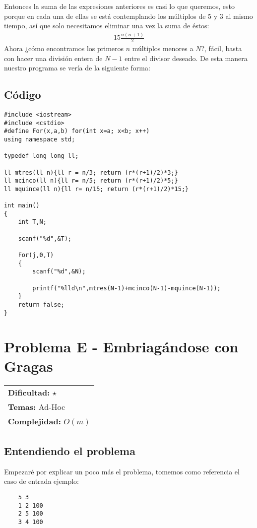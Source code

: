 Entonces la suma de las expresiones anteriores es casi lo que queremos, esto porque en cada una de ellas se está contemplando los múltiplos de 5 y 3 al mismo tiempo, así que solo necesitamos eliminar una vez la suma de éstos:
\begin{eqnarray*}
15 \frac{n(n+1)}{2}
\end{eqnarray*}
Ahora ¿cómo encontramos los primeros $n$ múltiplos menores a $N$?, fácil, basta con hacer una división entera de $N-1$ entre el divisor deseado. De esta manera  nuestro programa se vería de la siguiente forma:

\subsection*{Código}
\begin{verbatim}
#include <iostream>
#include <cstdio>
#define For(x,a,b) for(int x=a; x<b; x++)
using namespace std;

typedef long long ll;

ll mtres(ll n){ll r = n/3; return (r*(r+1)/2)*3;}
ll mcinco(ll n){ll r= n/5; return (r*(r+1)/2)*5;}
ll mquince(ll n){ll r= n/15; return (r*(r+1)/2)*15;}

int main()
{
	int T,N;
	
	scanf("%d",&T);
	
	For(j,0,T)
	{
		scanf("%d",&N);
		
		printf("%lld\n",mtres(N-1)+mcinco(N-1)-mquince(N-1));
	}
	return false;
}
\end{verbatim}


\section{Problema E - Embriagándose con Gragas}

\hfill
\begin{tabular}{@{}l@{}}
\textbf{Dificultad:} $\star$ \\
\textbf{Temas:} Ad-Hoc \\
\textbf{Complejidad:} $O(m)$
\end{tabular}

\subsection*{Entendiendo el problema}
Empezaré por explicar un poco más el problema, tomemos como referencia el caso de entrada
ejemplo:

\begin{verbatim}
    5 3
    1 2 100
    2 5 100
    3 4 100
\end{verbatim}

